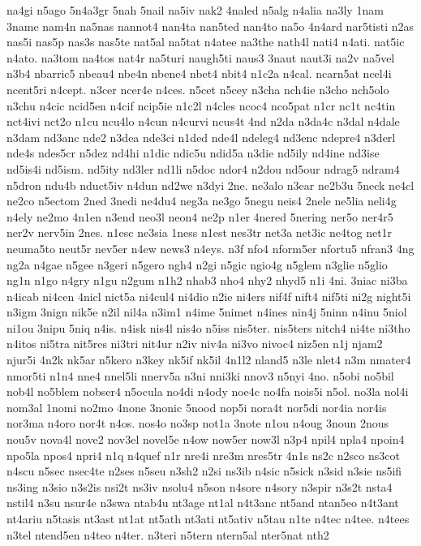 {na4gi
n5ago
5n4a3gr
5nah
5nail
na5iv
nak2
4naled
n5alg
n4alia
na3ly
1nam
3name
nam4n
na5nas
nannot4
nan4ta
nan5ted
nan4to
na5o
4n4ard
nar5tisti
n2as
nas5i
nas5p
nas3s
nas5te
nat5al
na5tat
n4atee
na3the
nath4l
nati4
n4ati.
nat5ic
n4ato.
na3tom
na4tos
nat4r
na5turi
naugh5ti
naus3
3naut
naut3i
na2v
na5vel
n3b4
nbarric5
nbeau4
nbe4n
nbene4
nbet4
nbit4
n1c2a
n4cal.
ncarn5at
ncel4i
ncent5ri
n4cept.
n3cer
ncer4e
n4ces.
n5cet
n5cey
n3cha
nch4ie
n3cho
nch5olo
n3chu
n4cic
ncid5en
n4cif
ncip5ie
n1c2l
n4cles
ncoc4
nco5pat
n1cr
nc1t
nc4tin
nct4ivi
nct2o
n1cu
ncu4lo
n4cun
n4curvi
ncus4t
4nd
n2da
n3da4c
n3dal
n4dale
n3dam
nd3anc
nde2
n3dea
nde3ci
n1ded
nde4l
ndeleg4
nd3enc
ndepre4
n3derl
nde4s
ndes5cr
n5dez
nd4hi
n1dic
ndic5u
ndid5a
n3die
nd5ily
nd4ine
nd3ise
nd5is4i
nd5ism.
nd5ity
nd3ler
nd1li
n5doc
ndor4
n2dou
nd5our
ndrag5
ndram4
n5dron
ndu4b
nduct5iv
n4dun
nd2we
n3dyi
2ne.
ne3alo
n3ear
ne2b3u
5neck
ne4cl
ne2co
n5ectom
2ned
3nedi
ne4du4
neg3a
ne3go
5negu
neis4
2nele
ne5lia
neli4g
n4ely
ne2mo
4n1en
n3end
neo3l
neon4
ne2p
n1er
4nered
5nering
ner5o
ner4r5
ner2v
nerv5in
2nes.
n1esc
ne3sia
1ness
n1est
nes3tr
net3a
net3ic
ne4tog
net1r
neuma5to
neut5r
nev5er
n4ew
news3
n4eys.
n3f
nfo4
nform5er
nfortu5
nfran3
4ng
ng2a
n4gae
n5gee
n3geri
n5gero
ngh4
n2gi
n5gic
ngio4g
n5glem
n3glie
n5glio
ng1n
n1go
n4gry
n1gu
n2gum
n1h2
nhab3
nho4
nhy2
nhyd5
n1i
4ni.
3niac
ni3ba
n4icab
ni4cen
4nicl
nict5a
ni4cul4
ni4dio
n2ie
ni4ers
nif4f
nift4
nif5ti
ni2g
night5i
n3igm
3nign
nik5e
n2il
nil4a
n3im1
n4ime
5nimet
n4ines
nin4j
5ninn
n4inu
5niol
ni1ou
3nipu
5niq
n4is.
n4isk
nis4l
nis4o
n5iss
nis5ter.
nis5ters
nitch4
ni4te
ni3tho
n4itos
ni5tra
nit5res
ni3tri
nit4ur
n2iv
niv4a
ni3vo
nivoc4
niz5en
n1j
njam2
njur5i
4n2k
nk5ar
n5kero
n3key
nk5if
nk5il
4n1l2
nland5
n3le
nlet4
n3m
nmater4
nmor5ti
n1n4
nne4
nnel5li
nnerv5a
n3ni
nni3ki
nnov3
n5nyi
4no.
n5obi
no5bil
nob4l
no5blem
nobser4
n5ocula
no4di
n4ody
noe4c
no4fa
nois5i
n5ol.
no3la
nol4i
nom3al
1nomi
no2mo
4none
3nonic
5nood
nop5i
nora4t
nor5di
nor4ia
nor4is
nor3ma
n4oro
nor4t
n4os.
nos4o
no3sp
not1a
3note
n1ou
n4oug
3noun
2nous
nou5v
nova4l
nove2
nov3el
novel5e
n4ow
now5er
now3l
n3p4
npil4
npla4
npoin4
npo5la
npos4
npri4
n1q
n4quef
n1r
nre4i
nre3m
nres5tr
4n1s
ns2c
n2sco
ns3cot
n4scu
n5sec
nsec4te
n2ses
n5seu
n3sh2
n2si
ns3ib
n4sic
n5sick
n3sid
n3sie
ns5ifi
ns3ing
n3sio
n3s2is
nsi2t
ns3iv
nsolu4
n5son
n4sore
n4sory
n3spir
n3s2t
nsta4
nstil4
n3su
nsur4e
n3swa
ntab4u
nt3age
nt1al
n4t3anc
nt5and
ntan5eo
n4t3ant
nt4ariu
n5tasis
nt3ast
nt1at
nt5ath
nt3ati
nt5ativ
n5tau
n1te
n4tec
n4tee.
n4tees
n3tel
ntend5en
n4teo
n4ter.
n3teri
n5tern
ntern5al
nter5nat
nth2
}
